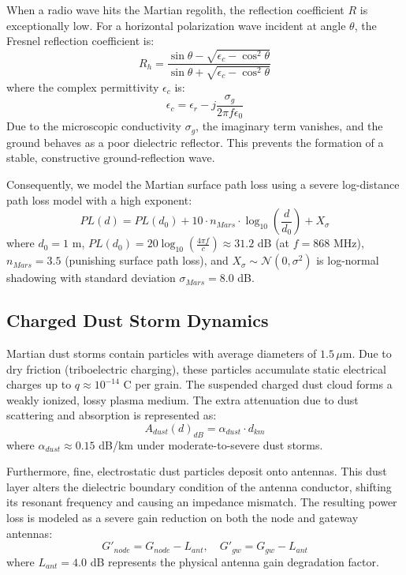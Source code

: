 \documentclass[journal,10pt,doublecolumn]{IEEEtran}
\begin{document}
When a radio wave hits the Martian regolith, the reflection coefficient $R$ is exceptionally low. For a horizontal polarization wave incident at angle $\theta$, the Fresnel reflection coefficient is:
\begin{equation}
    R_h = \frac{\sin\theta - \sqrt{\epsilon_c - \cos^2\theta}}{\sin\theta + \sqrt{\epsilon_c - \cos^2\theta}}
\end{equation}
where the complex permittivity $\epsilon_c$ is:
\begin{equation}
    \epsilon_c = \epsilon_r - j\frac{\sigma_g}{2\pi f \epsilon_0}
\end{equation}
Due to the microscopic conductivity $\sigma_g$, the imaginary term vanishes, and the ground behaves as a poor dielectric reflector. This prevents the formation of a stable, constructive ground-reflection wave. 

Consequently, we model the Martian surface path loss using a severe log-distance path loss model with a high exponent:
\begin{equation}
    PL(d) = PL(d_0) + 10 \cdot n_{Mars} \cdot \log_{10}\left(\frac{d}{d_0}\right) + X_{\sigma}
\end{equation}
where $d_0 = 1$ m, $PL(d_0) = 20\log_{10}(\frac{4\pi f}{c}) \approx 31.2$ dB (at $f = 868$ MHz), $n_{Mars} = 3.5$ (punishing surface path loss), and $X_\sigma \sim \mathcal{N}(0, \sigma^2)$ is log-normal shadowing with standard deviation $\sigma_{Mars} = 8.0$ dB.

\subsection{Charged Dust Storm Dynamics}
Martian dust storms contain particles with average diameters of $1.5\,\mu\text{m}$. Due to dry friction (triboelectric charging), these particles accumulate static electrical charges up to $q \approx 10^{-14}$ C per grain. The suspended charged dust cloud forms a weakly ionized, lossy plasma medium. The extra attenuation due to dust scattering and absorption is represented as:
\begin{equation}
    A_{dust}(d)_{dB} = \alpha_{dust} \cdot d_{km}
\end{equation}
where $\alpha_{dust} \approx 0.15$ dB/km under moderate-to-severe dust storms.

Furthermore, fine, electrostatic dust particles deposit onto antennas. This dust layer alters the dielectric boundary condition of the antenna conductor, shifting its resonant frequency and causing an impedance mismatch. The resulting power loss is modeled as a severe gain reduction on both the node and gateway antennas:
\begin{equation}
    G'_{node} = G_{node} - L_{ant}, \quad G'_{gw} = G_{gw} - L_{ant}
\end{equation}
where $L_{ant} = 4.0$ dB represents the physical antenna gain degradation factor.
\end{document}
